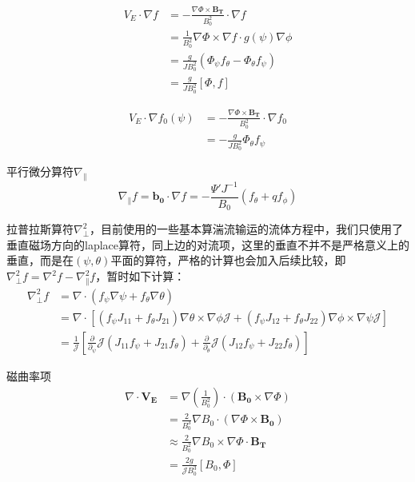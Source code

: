 \documentclass[11pt,a4paper]{article}
\begin{document}
$$
\begin{aligned}
V_E\cdot\nabla f
&= -\frac{\nabla\Phi\times\pmb{B_T}}{B^2_0}\cdot\nabla f \\  
&= \frac{1}{B_0^2}\nabla\Phi\times\nabla f\cdot g(\psi)\nabla\phi \\ 
&= \frac{g}{JB^2_0}(\Phi_\psi f_\theta - \Phi_\theta f_\psi) \\
&= \frac{g}{JB^2_0}[\Phi,f] 
\end{aligned}    
$$	
	
$$
\begin{aligned}
V_E\cdot\nabla f_0(\psi)
&= -\frac{\nabla\Phi\times\pmb{B_T}}{B^2_0}\cdot\nabla f_0 \\
&= -\frac{g}{JB^2_0} \Phi_\theta f_\psi
\end{aligned}
$$
	
平行微分算符$\nabla_\parallel$
$$ 
\nabla_\parallel f = \pmb{b_0}\cdot\nabla f = -\frac{\Psi'J^{-1}}{B_0}(f_\theta + qf_\phi)  
$$
	
拉普拉斯算符$\nabla^2_\perp$，目前使用的一些基本算湍流输运的流体方程中，我们只使用了垂直磁场方向的laplace算符，同上边的对流项，这里的垂直不并不是严格意义上的垂直，而是在$(\psi,\theta)$平面的算符，严格的计算也会加入后续比较，即$\nabla^2_\perp f= \nabla^2 f - \nabla^2_\parallel f$，暂时如下计算：
$$
\begin{aligned}
\nabla_\perp^2 f  
&= \nabla\cdot(f_\psi \nabla\psi + f_\theta\nabla\theta) \\
&= \nabla\cdot[ (f_\psi J_{11} + f_\theta J_{21}) \nabla\theta\times\nabla\phi\mathcal{J} + (f_\psi J_{12}+f_\theta J_{22}) \nabla\phi\times\nabla\psi\mathcal{J} ] \\
&= \frac{1}{\mathcal{J}} 
[ \frac{\partial}{\partial_\psi}\mathcal{J}(J_{11}f_\psi + J_{21}f_\theta) 
+\frac{\partial}{\partial_\theta}\mathcal{J}(J_{12}f_\psi + J_{22}f_\theta) ]  
\end{aligned}
$$

磁曲率项
$$
\begin{aligned}
\nabla\cdot{\pmb{V_E}} 
&= \nabla(\frac{1}{B_0^2})\cdot(\pmb{B_0}\times\nabla\Phi) \\
&= \frac{2}{B_0^3}\nabla{B_0}\cdot(\nabla\Phi\times\pmb{B_0}) \\
&\approx \frac{2}{B_0^2}\nabla{B_0}\times\nabla\Phi\cdot\pmb{B_T}    \\
&= \frac{2g}{\mathcal{J}B_0^3}[B_0,\Phi]  
\end{aligned}
$$
\end{document}
